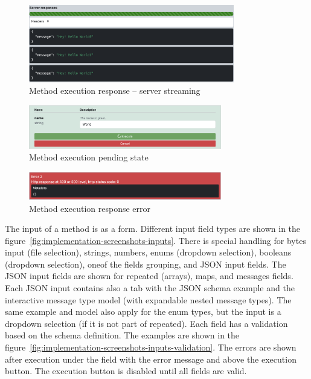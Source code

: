 \begin{figure}[!htb]
    \centering
    \captionsetup{justification=centering}
    \includegraphics[width=0.8\textwidth]{images/implementation/screenshots/responses-streaming}
    \caption{Method execution response -- server streaming}
    \label{fig:implementation-screenshots-responses-streaming}
\end{figure}


\begin{figure}[!htb]
    \centering
    \captionsetup{justification=centering}
    \includegraphics[width=0.75\textwidth]{images/implementation/screenshots/execution-pending}
    \caption{Method execution pending state}
    \label{fig:implementation-screenshots-execution-pending}
\end{figure}

\begin{figure}[!htb]
    \centering
    \captionsetup{justification=centering}
    \includegraphics[width=0.75\textwidth]{images/implementation/screenshots/response-error}
    \caption{Method execution response error}
    \label{fig:implementation-screenshots-response-error}
\end{figure}

The input of a method is as a form.
Different input field types are shown in the figure~\ref{fig:implementation-screenshots-inputs}.
There is special handling for bytes input (file selection), strings, numbers, enums (dropdown selection), booleans (dropdown selection), oneof the fields grouping, and JSON input fields.
The JSON input fields are shown for repeated (arrays), maps, and messages fields.
Each JSON input contains also a tab with the JSON schema example and the interactive message type model (with expandable nested message types).
The same example and model also apply for the enum types, but the input is a dropdown selection (if it is not part of repeated).
Each field has a validation based on the schema definition.
The examples are shown in the figure~\ref{fig:implementation-screenshots-inputs-validation}.
The errors are shown after execution under the field with the error message and above the execution button.
The execution button is disabled until all fields are valid.

